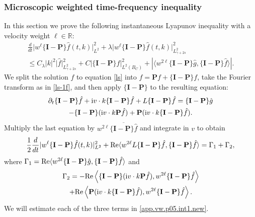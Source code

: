 \documentclass{amsart}
\numberwithin{equation}{section}
\begin{document}
\subsubsection{Microscopic weighted time-frequency  inequality}
In this section we prove the following instantaneous Lyapunov inequality
with a velocity weight ${\ell} \in {\mathbb{R}}$:
\begin{multline}\label{macroWeightINEQ}
\frac{d}{dt}{|} w^{\ell}\{{\mathbf{I}}-{\mathbf{P}}\}\hat{f}(t,k){|}^2_{L^2} +
{\lambda} {|} w^{\ell}\{{\mathbf{I}}-{\mathbf{P}}\}\hat{f}(t,k){|}^2_{L^2_{\gamma+2s}}
\\
\le C_\lambda |k|^2 {|} \hat{f}{|}^2_{L^2_{\gamma+2s}}
+
 C {|}\{{\mathbf{I}}-{\mathbf{P}}\}\hat{f}{|}_{L^2(B_{C})}^2
+
\left| \langle w^{2{\ell}} \{{\mathbf{I}}-{\mathbf{P}}\}\hat{g},\{{\mathbf{I}}-{\mathbf{P}}\} \hat{f}\rangle \right|.
\end{multline}
We split the solution ${f}$ to equation \eqref{ls} into ${f}={\mathbf{P}} {f} + \{{\mathbf{I}}-{\mathbf{P}}\}{f}$, take the Fourier transform as in \eqref{ls-1f},  and then apply $\{{\mathbf{I}}-{\mathbf{P}}\}$ to the resulting equation:
\begin{multline}\notag
{\partial}_t \{{\mathbf{I}}-{\mathbf{P}}\}\hat{f} + {{\rm i}} {v} \cdot k \{{\mathbf{I}}-{\mathbf{P}}\}\hat{f} 
+
{L}\{{\mathbf{I}}-{\mathbf{P}}\} \hat{f} 
=\{{\mathbf{I}}-{\mathbf{P}}\}\hat{g}
 \\
-\{{\mathbf{I}}-{\mathbf{P}}\}({{\rm i}} {v} \cdot k {\mathbf{P}} \hat{f} )
 +{\mathbf{P}} ({{\rm i}} {v} \cdot k \{{\mathbf{I}}-{\mathbf{P}}\}\hat{f}).
\end{multline}
Multiply the last equation by $w^{2{\ell}} \overline{\{{\mathbf{I}}-{\mathbf{P}}\}\hat{f}}$ and integrate in ${v}$ to obtain
\begin{equation}
\label{app.vw.p05.int1.new}
\frac{1}{2}\frac{d}{dt}{|} w^{\ell}\{{\mathbf{I}}-{\mathbf{P}}\}\hat{f}(t,k){|}^2_{L^2} +
 {{\rm Re}} \langle w^{2{\ell}}{L}\{{\mathbf{I}}-{\mathbf{P}}\} \hat{f},\{{\mathbf{I}}-{\mathbf{P}}\} \hat{f}\rangle
 =
 {\Gamma}_1+ {\Gamma}_2,
\end{equation}
where $ {\Gamma}_1 = {{\rm Re}} \langle w^{2{\ell}} \{{\mathbf{I}}-{\mathbf{P}}\}\hat{g},\{{\mathbf{I}}-{\mathbf{P}}\} \hat{f}\rangle$ and
\begin{multline*}
 {\Gamma}_2 =
-{{\rm Re}}\left\langle
\{{\mathbf{I}}-{\mathbf{P}}\}({{\rm i}} {v} \cdot k{\mathbf{P}} \hat{f} ),
w^{2{\ell}}  \{{\mathbf{I}}-{\mathbf{P}}\}\hat{f}
\right\rangle
\\
 +{{\rm Re}} \left\langle
 {\mathbf{P}} ({{\rm i}} {v} \cdot k \{{\mathbf{I}}-{\mathbf{P}}\}\hat{f}),
w^{2{\ell}}  \{{\mathbf{I}}-{\mathbf{P}}\}\hat{f}  \right\rangle.
\end{multline*}
We will estimate each of the
three terms in \eqref{app.vw.p05.int1.new}.
\end{document}

